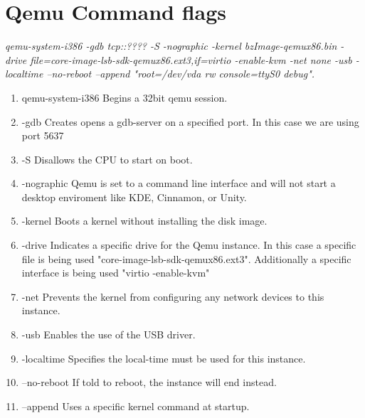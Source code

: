 \documentclass[letterpaper,10pt,titlepage]{IEEEtran}
\begin{document}
\section{Qemu Command flags}
  \emph{
  qemu-system-i386 -gdb tcp::???? -S -nographic -kernel bzImage-qemux86.bin -drive file=core-image-lsb-sdk-qemux86.ext3,if=virtio -enable-kvm -net none -usb -localtime --no-reboot --append "root=/dev/vda rw console=ttyS0 debug".}
  \linebreak
  \begin{enumerate}
  
    \item qemu-system-i386
    \linebreak
    Begins a 32bit qemu session.

    \item -gdb
    \linebreak
    Creates opens a gdb-server on a specified port. In this case we are using port 5637
    
    \item -S
    \linebreak
    Disallows the CPU to start on boot.
    
    \item -nographic
    \linebreak
    Qemu is set to a command line interface and will not start a desktop enviroment like KDE, Cinnamon, or Unity.
    
    \item -kernel
    \linebreak
    Boots a kernel without installing the disk image.
    
    \item -drive
    \linebreak
    Indicates a specific drive for the Qemu instance. In this case a specific file is being used "core-image-lsb-sdk-qemux86.ext3". Additionally a specific interface is being used "virtio -enable-kvm"
    
    \item -net
    \linebreak
    Prevents the kernel from configuring any network devices to this instance.
    
    \item -usb
    \linebreak
    Enables the use of the USB driver.
    
    \item -localtime
    \linebreak
    Specifies the local-time must be used for this instance.
    
    \item --no-reboot
    \linebreak
    If told to reboot, the instance will end instead.
    
    \item --append
    \linebreak
    Uses a specific kernel command at startup.
  \end{enumerate}
  
\end{document}
